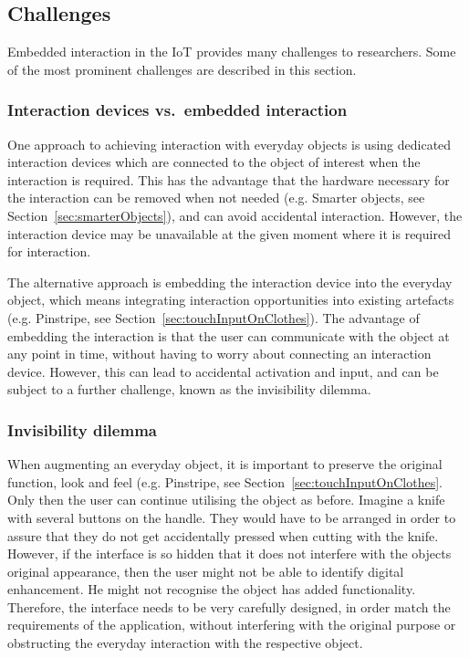 \subsection{Challenges}
\label{sec:challenges}
Embedded interaction in the IoT provides many challenges to researchers. Some of the most prominent challenges are described in this section.

\subsubsection{Interaction devices vs.\ embedded interaction}
One approach to achieving interaction with everyday objects is using dedicated interaction devices which are connected to the object of interest when the interaction is required.
This has the advantage that the hardware necessary for the interaction can be removed when not needed (e.g. Smarter objects, see Section~\ref{sec:smarterObjects}), and can avoid accidental interaction. 
However, the interaction device may be unavailable at the given moment where it is required for interaction.

The alternative approach is embedding the interaction device into the everyday object, which means integrating interaction opportunities into existing artefacts (e.g. Pinstripe, see Section~\ref{sec:touchInputOnClothes}). 
The advantage of embedding the interaction is that the user can communicate with the object at any point in time, without having to worry about connecting an interaction device.
However, this can lead to accidental activation and input, and can be subject to a further challenge, known as the invisibility dilemma.

\subsubsection{Invisibility dilemma}
When augmenting an everyday object, it is important to preserve the original function, look and feel (e.g. Pinstripe, see Section~\ref{sec:touchInputOnClothes}.
Only then the user can continue utilising the object as before. Imagine a knife with several buttons on the handle. They would have to be arranged in order to assure that they do not get accidentally pressed when cutting with the knife.
However, if the interface is so hidden that it does not interfere with the objects original appearance, then the user might not be able to identify digital enhancement.
He might not recognise the object has added functionality.
Therefore, the interface needs to be very carefully designed, in order match the requirements of the application, without interfering with the original purpose or obstructing the everyday interaction with the respective object.

